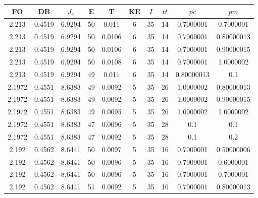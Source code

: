 \begin{table}[h!]
    \footnotesize
    \begin{center}
        \begin{tabular}{|c|c|c|c|c|c|c|c|c|c|}
        \hline
            {\bf FO} & {\bf DB} & $J_e$ & {\bf E} & {\bf T} & {\bf KE} & $I$ & $tt$ & $pc$ & $pm$ \\
        \hline
        \hline
            2.213 & 0.4519  & 6.9294 & 50 & 0.011 & 6 & 35 & 14 & 0.7000001 & 0.7000001\\
        \hline
        \hline
            2.213 & 0.4519  & 6.9294 & 50 & 0.0106 & 6 & 35 & 14 & 0.7000001 & 0.80000013\\
        \hline
        \hline
            2.213 & 0.4519  & 6.9294 & 50 & 0.0106 & 6 & 35 & 14 & 0.7000001 & 0.90000015\\
        \hline
        \hline
            2.213 & 0.4519  & 6.9294 & 50 & 0.0108 & 6 & 35 & 14 & 0.7000001 & 1.0000002\\
        \hline
        \hline
            2.213 & 0.4519  & 6.9294 & 49 & 0.011 & 6 & 35 & 14 & 0.80000013 & 0.1\\
        \hline
        \hline
            2.1972 & 0.4551  & 8.6383 & 49 & 0.0092 & 5 & 35 & 26 & 1.0000002 & 0.80000013\\
        \hline
        \hline
            2.1972 & 0.4551  & 8.6383 & 49 & 0.0092 & 5 & 35 & 26 & 1.0000002 & 0.90000015\\
        \hline
        \hline
            2.1972 & 0.4551  & 8.6383 & 49 & 0.0095 & 5 & 35 & 26 & 1.0000002 & 1.0000002\\
        \hline
        \hline
            2.1972 & 0.4551  & 8.6383 & 47 & 0.0096 & 5 & 35 & 28 & 0.1 & 0.1\\
        \hline
        \hline
            2.1972 & 0.4551  & 8.6383 & 47 & 0.0092 & 5 & 35 & 28 & 0.1 & 0.2\\
        \hline
        \hline
            2.192 & 0.4562  & 8.6441 & 50 & 0.0097 & 5 & 35 & 16 & 0.7000001 & 0.50000006\\
        \hline
        \hline
            2.192 & 0.4562  & 8.6441 & 50 & 0.0096 & 5 & 35 & 16 & 0.7000001 & 0.6000001\\
        \hline
        \hline
            2.192 & 0.4562  & 8.6441 & 50 & 0.0096 & 5 & 35 & 16 & 0.7000001 & 0.7000001\\
        \hline
        \hline
            2.192 & 0.4562  & 8.6441 & 51 & 0.0092 & 5 & 35 & 16 & 0.7000001 & 0.80000013\\

\end{tabular}
\end{center}
\end{table}
